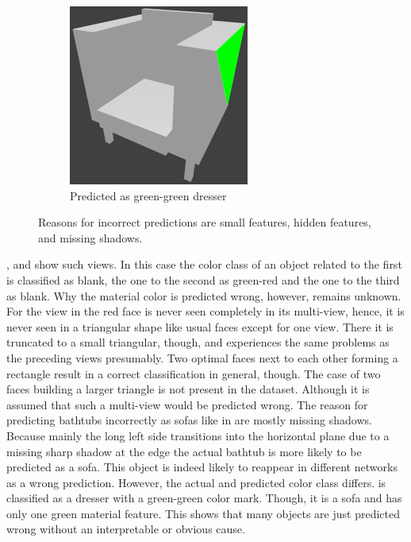 \begin{figure}
\begin{subfigure}{.3\textwidth}
		\centering
		\includegraphics[width=.8\textwidth]{images/sofa_0681_1_010.png}
		\caption{Predicted as green-green dresser}
		\label{fig:small-features-f}
	\end{subfigure}
	\caption[Reasons for incorrect predictions]{Reasons for incorrect predictions are small features, hidden features, and missing shadows.}
	\label{fig:small-features}
\end{figure}
,  and  show such views.
In this case the color class of an object related to the first is classified as blank, the one to the second as green-red and the one to the third as blank.
Why the material color is predicted wrong, however, remains unknown.
For the view in  the red face is never seen completely in its multi-view, hence, it is never seen in a triangular shape like usual faces except for one view.
There it is truncated to a small triangular, though, and experiences the same problems as the preceding views presumably.
Two optimal faces next to each other forming a rectangle result in a correct classification in general, though.
The case of two faces building a larger triangle is not present in the dataset.
Although it is assumed that such a multi-view would be predicted wrong.
The reason for predicting bathtubs incorrectly as sofas like in  are mostly missing shadows.
Because mainly the long left side transitions into the horizontal plane due to a missing sharp shadow at the edge the actual bathtub is more likely to be predicted as a sofa.
This object is indeed likely to reappear in different networks as a wrong prediction.
However, the actual and predicted color class differs.
 is classified as a dresser with a green-green color mark.
Though, it is a sofa and has only one green material feature.
This shows that many objects are just predicted wrong without an interpretable or obvious cause.